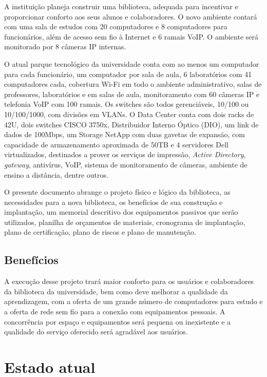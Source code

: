 \documentclass[	DIV=calc,%
							paper=a4,%
							fontsize=12pt,%
							onecolumn]{scrartcl}	 					%
\begin{document}
A instituição planeja construir uma biblioteca, adequada para incentivar e proporcionar conforto aos seus alunos e colaboradores. O novo ambiente contará com uma sala de estudos com 20 computadores e 8 computadores para funcionários, além de acesso sem fio à Internet e 6 ramais VoIP. O ambiente será monitorado por 8 câmeras IP internas.

O atual parque tecnológico da universidade conta com ao menos um computador para cada funcionário, um computador por sala de aula, 6 laboratórios com 41 computadores cada, cobertura Wi-Fi em todo o ambiente administrativo, salas de professores, laboratórios e em salas de aula, monitoramento com 60 câmeras IP e telefonia VoIP com 100 ramais. Os switches são todos gerenciáveis, 10/100 ou 10/100/1000, com divisões em VLANs. O Data Center conta com dois racks de 42U, dois switches CISCO 3750x, Distribuidor Interno Óptico (DIO), um link de dados de 100Mbps, um Storage NetApp com duas gavetas de expansão, com capacidade de armazenamento aproximada de 50TB e 4 servidores Dell virtualizados, destinados a prover os serviços de impressão, \textit{Active Directory}, \textit{gateway}, antivírus, VoIP, sistema de monitoramento de câmeras, ambiente de ensino a distância, dentre outros.

O presente documento abrange o projeto físico e lógico da biblioteca, as necessidades para a nova biblioteca, os benefícios de sua construção e implantação, um memorial descritivo dos equipamentos passivos que serão utilizados, planilha de orçamentos de materiais, cronograma de implantação, plano de certificação, plano de riscos e plano de manutenção.

\subsection{Benefícios}

A execução desse projeto trará maior conforto para os usuários e colaboradores da biblioteca da universidade, bem como deve melhorar a qualidade da aprendizagem, com a oferta de um grande número de computadores para estudo e a oferta de rede sem fio para a conexão com equipamentos pessoais. A concorrência por espaço e equipamentos será pequena ou inexistente e a qualidade do serviço oferecido será agradável aos usuários.

\section{Estado atual}
\end{document}
